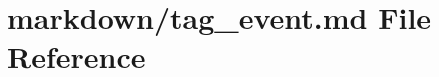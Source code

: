 \hypertarget{tag__event_8md}{}\section{markdown/tag\+\_\+event.md File Reference}
\label{tag__event_8md}
